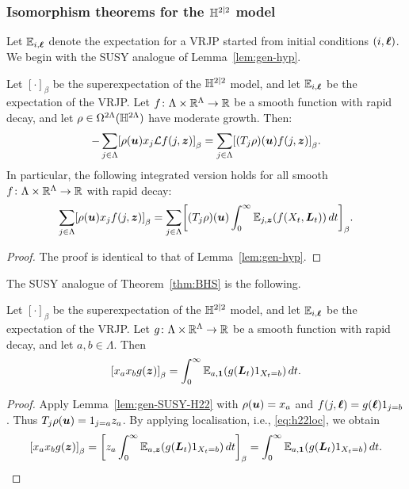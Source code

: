 \documentclass[11pt,a4paper]{article}
\begin{document}
\subsubsection{Isomorphism theorems for the $\mathbb{H}^{2|2}$ model}
\label{sec:isom-theor-hh22}

Let $\mathbb{E}_{i,\boldsymbol{\ell}}$ denote the expectation for a VRJP started from
initial conditions $(i,\boldsymbol{\ell})$. We begin with the SUSY analogue of
Lemma~\ref{lem:gen-hyp}.
\begin{lemma}
  \label{lem:gen-SUSY-H22}
  Let $[\cdot]_\beta$ be the superexpectation of the $\mathbb{H}^{2|2}$ model, and let $\mathbb{E}_{i,\boldsymbol{\ell}}$ be the expectation of the VRJP.
  Let $f\colon \Lambda\times \mathbb{R}^{\Lambda} 
  \to \mathbb{R}$ be a smooth function with rapid decay, and let
  $\rho\in \Omega^{2\Lambda}(\mathbb{H}^{2\Lambda})$ have moderate growth.
  Then:
  \begin{equation}
    \label{eq:gen-lem-H22}
    -\sum_{j\in\Lambda}\cb{\rho(\V{u})x_{j} \cL f(j,\V{z})}_{\beta}
    =
    \sum_{j\in\Lambda} \cb{(T_j\rho)(\V{u})f(j,\V{z})}_{\beta}
    .
  \end{equation}
  In particular, the following integrated version holds for all
  smooth $f\colon\Lambda\times \mathbb{R}^{\Lambda} 
  \to\mathbb{R}$ with rapid decay:
  \begin{equation}
    \label{eq:generic-iso-susy-H22}
    \sum_{j\in\Lambda}\uspin{\rho(\V{u})x_{j} f(j, \V{z})}_{\beta}
    =
    \sum_{j\in\Lambda} \uspin{(T_j\rho)(\V{u})\int_0^\infty \E_{j,\V{z}}(f(X_t,\V{L}_t))\,dt}_{\beta}
    .
  \end{equation}
\end{lemma}
\begin{proof}
The proof is identical to that of Lemma~\ref{lem:gen-hyp}.
\end{proof}

The SUSY analogue of Theorem~\ref{thm:BHS} is the following.
\begin{theorem}
  \label{thm:SUSY-BHS}
  Let $[\cdot]_\beta$ be the superexpectation of the $\mathbb{H}^{2|2}$
  model, and let $\mathbb{E}_{i,\boldsymbol{\ell}}$ be the expectation of the VRJP.
  Let $g\colon \Lambda\times\mathbb{R}^{\Lambda}\to \mathbb{R}$ be a smooth function
  with rapid decay, and let $a,b\in\Lambda$. Then
  \begin{equation}
    \label{eq:H22-iso}
    \uspin{x_{a}x_{b}g(\V{z})}_{\beta} =
    \int_{0}^{\infty}\E_{a,\V{1}}(g(\V{L}_{t})1_{X_t = b})\,dt.
  \end{equation}
\end{theorem}

\begin{proof}
  Apply Lemma~\ref{lem:gen-SUSY-H22} with $\rho(\boldsymbol{u}) = x_a$
  and $f(j,\boldsymbol{\ell}) = g(\boldsymbol{\ell})1_{j=b}$. Thus
  $T_j\rho(\boldsymbol{u}) = 1_{j=a}z_a$. By applying localisation, i.e.,
  \eqref{eq:h22loc}, we obtain
  \begin{equation*}
    \uspin{x_{a}x_{b}g(\V{z})}_{\beta} =\uspin{z_a \int_{0}^{\infty}\E_{a,\V{z}}(g(\V{L}_{t})1_{X_t = b})\,dt}_{\beta} = \int_{0}^{\infty}\E_{a,\V{1}}(g(\V{L}_{t})1_{X_t = b})\,dt.\qedhere
  \end{equation*}
\end{proof}
\end{document}
